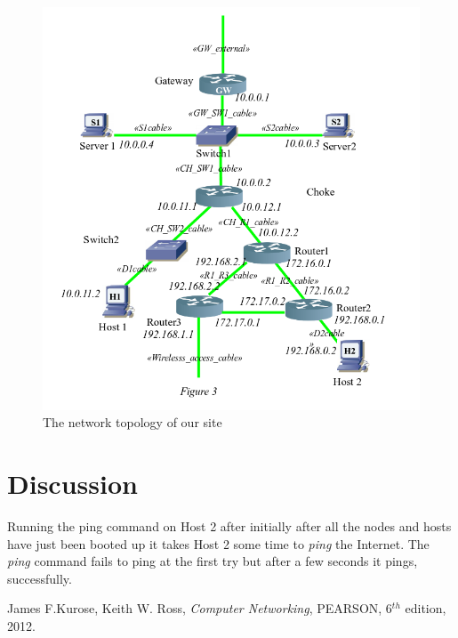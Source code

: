 \documentclass{article}
\begin{document}
\begin{figure}[h]
    \centering
    \includegraphics[scale=0.3]{net-top-site}
    \caption{The network topology of our site}
    \label{fig:site-top}
\end{figure}

\part{Discussion}

Running the ping command on Host 2 after initially after all the nodes and hosts have just been booted up it takes Host 2 some time to \textit{ping} the Internet. The \textit{ping} command fails to ping at the first try but after a few seconds it pings, successfully. 

\begin{thebibliography}{9}
  James F.Kurose, Keith W. Ross,
  \emph{Computer Networking},
  PEARSON, 
  6$^{th}$ edition,
  2012.
\end{thebibliography}
\end{document}
